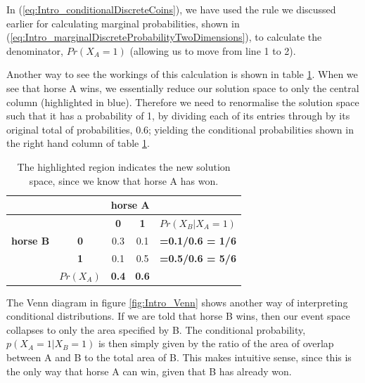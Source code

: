 \documentclass[11pt,fullpage]{book}
\begin{document}
In (\ref{eq:Intro_conditionalDiscreteCoins}), we have used the rule we discussed earlier for calculating marginal probabilities, shown in (\ref{eq:Intro_marginalDiscreteProbabilityTwoDimensions}), to calculate the denominator, $Pr(X_A=1)$ (allowing us to move from line 1 to 2).

Another way to see the workings of this calculation is shown in table \ref{tab:Intro_coinsConditionalDiscrete}. When we see that horse A wins, we essentially reduce our solution space to only the central column (highlighted in blue). Therefore we need to renormalise the solution space such that it has a probability of 1, by dividing each of its entries through by its original total of probabilities, 0.6; yielding the conditional probabilities shown in the right hand column of table \ref{tab:Intro_coinsConditionalDiscrete}.

\begin{table}[htbp]
  \centering
    \begin{tabular}{rrccr}
    \toprule
          &       & \multicolumn{2}{c}{\textbf{horse A}} &  \\
    \midrule
          &       & \textbf{0} & \textbf{1} & \multicolumn{1}{c}{\textbf{$Pr(X_B|X_A=1)$}} \\
    \multicolumn{1}{c}{\textbf{horse B}} & \multicolumn{1}{c}{\textbf{0}} & 0.3   & {\color{blue}0.1}   & \multicolumn{1}{c}{\textbf{=0.1/0.6 = 1/6}} \\
    \multicolumn{1}{c}{} & \multicolumn{1}{c}{\textbf{1}} & 0.1   & {\color{blue}0.5}   & \multicolumn{1}{c}{\textbf{=0.5/0.6 = 5/6}} \\
          & \multicolumn{1}{c}{\textbf{$Pr(X_A)$}} & \textbf{0.4} & {\color{blue}\textbf{0.6}} & \multicolumn{1}{c}{} \\
    \bottomrule
    \end{tabular}%
\caption{The highlighted region indicates the new solution space, since we know that horse A has won.}
\label{tab:Intro_coinsConditionalDiscrete}
\end{table}

The Venn diagram in figure \ref{fig:Intro_Venn} shows another way of interpreting conditional distributions. If we are told that horse B wins, then our event space collapses to only the area specified by B. The conditional probability, $p(X_A=1|X_B=1)$ is then simply given by the ratio of the area of overlap between A and B to the total area of B. This makes intuitive sense, since this is the only way that horse A can win, given that B has already won.
\end{document}
